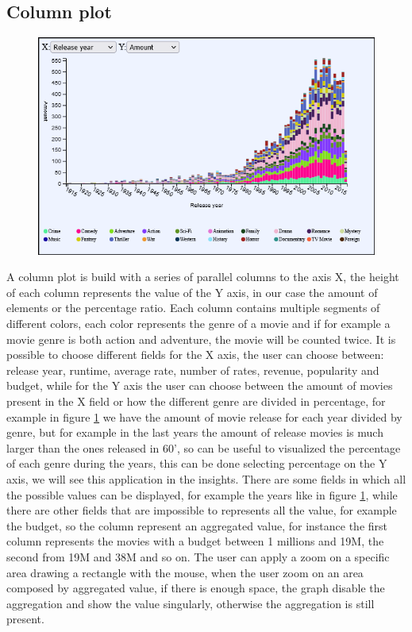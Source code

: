 \documentclass[]{article}
\begin{document}
\subsection{Column plot}
\begin{figure}[H]
	\centering
	\includegraphics[width=1\linewidth]{images/column_plot}
	\caption[Column plot]{}
	\label{fig:columnplot}
\end{figure}
A column plot is build with a series of parallel columns to the axis X, the height of each column represents the value of the Y axis, in our case the amount of elements or the percentage ratio.\newline
Each column contains multiple segments of different colors, each color represents the genre of a movie and if for example a movie genre is both action and adventure, the movie will be counted twice.\newline
It is possible to choose different fields for the X axis, the user can choose between: release year, runtime, average rate, number of rates, revenue, popularity and budget, while for the Y axis the user can choose between the amount of movies present in the X field or how the different genre are divided in percentage, for example in figure \ref{fig:columnplot} we have the amount of movie release for each year divided by genre, but for example in the last years the amount of release movies is much larger than the ones released in 60', so can be useful to visualized the percentage of each genre during the years, this can be done selecting percentage on the Y axis, we will see this application in the insights.\newline
There are some fields in which all the possible values can be displayed, for example the years like in figure \ref{fig:columnplot}, while there are other fields that are impossible to represents all the value, for example the budget, so the column represent an aggregated value, for instance the first column represents the movies with a budget between 1 millions and 19M, the second from 19M and 38M and so on. The user can apply a zoom on a specific area drawing a rectangle with the mouse, when the user zoom on an area composed by aggregated value, if there is enough space, the graph disable the aggregation and show the value singularly, otherwise the aggregation is still present.
\end{document}
